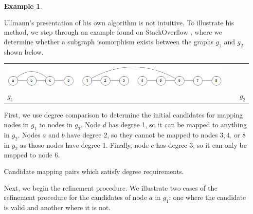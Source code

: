 \documentclass[12pt]{thesis}
\theoremstyle{plain}
\theoremstyle{definition}
\newtheorem{example}[theorem]{Example}
\theoremstyle{remark}
\begin{document}
\begin{example}\label{ex:ullmann}

Ullmann's presentation of his own algorithm is not intuitive. To illustrate his method, we step through an example found on StackOverflow \cite{ullmannStackOverflow}, where we determine whether a subgraph isomorphism exists between the graphs $g_1$ and $g_2$ shown below.


\vspace{-30pt}
\begin{center}
\begin{tabular}{C{0.35\textwidth}C{0.6\textwidth}}
\includegraphics[width=0.95\textwidth]{ullmann_demo_cropped.png} & \\ $g_1$ & $g_2$\\
\end{tabular}
\end{center}

First, we use degree comparison to determine the initial candidates for mapping nodes in $g_1$ to nodes in $g_2$. Node $d$ has degree 1, so it can be mapped to anything in $g_2$. Nodes $a$ and $b$ have degree 2, so they cannot be mapped to nodes $3, 4$, or $8$ in $g_2$ as those nodes have degree 1. Finally, node $c$ has degree 3, so it can only be mapped to node 6.

\begin{center}
\footnotesize\singlespacing Candidate mapping pairs which satisfy degree requirements.
\end{center}
\vspace{-5pt}

Next, we begin the refinement procedure. We illustrate two cases of the refinement procedure for the candidates of node $a$ in $g_1$: one where the candidate is valid and another where it is not.


\end{example}
\end{document}

